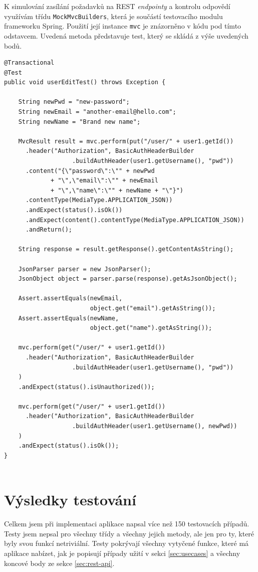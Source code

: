 \documentclass[thesis=B,czech]{FITthesis}[2012/06/26]
\begin{document}
			K simulování zasílání požadavků na REST \textit{endpointy} a kontrolu odpovědí využívám třídu \texttt{MockMvcBuilders}, která je součástí testovacího modulu frameworku Spring. Použití její instance \texttt{mvc} je znázorněno v kódu pod tímto odstavcem. Uvedená metoda představuje test, který se skládá z výše uvedených bodů.
			
		\begin{Verbatim}[obeytabs,tabsize=2]
@Transactional
@Test
public void userEditTest() throws Exception {

	String newPwd = "new-password";
	String newEmail = "another-email@hello.com";
	String newName = "Brand new name";
	
	MvcResult result = mvc.perform(put("/user/" + user1.getId())
	  .header("Authorization", BasicAuthHeaderBuilder
                   .buildAuthHeader(user1.getUsername(), "pwd"))
	  .content("{\"password\":\"" + newPwd
	         + "\",\"email\":\"" + newEmail
	         + "\",\"name\":\"" + newName + "\"}")
	  .contentType(MediaType.APPLICATION_JSON))
	  .andExpect(status().isOk())
	  .andExpect(content().contentType(MediaType.APPLICATION_JSON))
	  .andReturn();
	
	String response = result.getResponse().getContentAsString();
	
	JsonParser parser = new JsonParser();
	JsonObject object = parser.parse(response).getAsJsonObject();
	
	Assert.assertEquals(newEmail, 
	                    object.get("email").getAsString());
	Assert.assertEquals(newName, 
	                    object.get("name").getAsString());
	
	mvc.perform(get("/user/" + user1.getId())
	  .header("Authorization", BasicAuthHeaderBuilder
	               .buildAuthHeader(user1.getUsername(), "pwd"))
	)
	.andExpect(status().isUnauthorized());
	
	mvc.perform(get("/user/" + user1.getId())
	  .header("Authorization", BasicAuthHeaderBuilder
	               .buildAuthHeader(user1.getUsername(), newPwd))
	)
	.andExpect(status().isOk());
}
		
		\end{Verbatim}

		
	\section{Výsledky testování}
		Celkem jsem při implementaci aplikace napsal více než 150 testovacích případů. Testy jsem nepsal pro všechny třídy a všechny jejich metody, ale jen pro ty, které byly svou funkcí netriviální. Testy pokrývají všechny vytyčené funkce, které má aplikace nabízet, jak je popisují případy užití v sekci \ref{sec:usecases} a všechny koncové body ze sekce \ref{sec:rest-api}.
		
\end{document}

